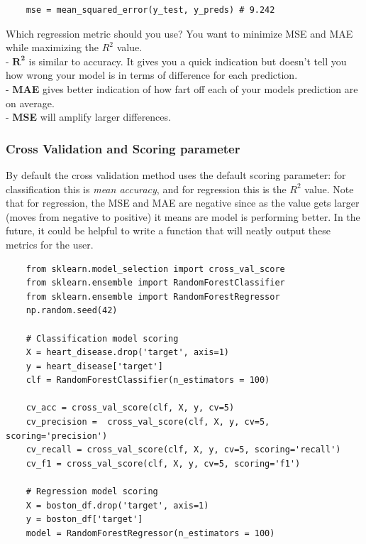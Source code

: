 \documentclass[11pt, a4paper]{article}
\begin{document}
\begin{spacing}{1.1}
\begin{lstlisting}
	mse = mean_squared_error(y_test, y_preds) # 9.242 \end{lstlisting} \vspace*{1mm}
	Which regression metric should you use? You want to minimize MSE and MAE while maximizing the $R^2$ value. \\
	\hspace*{2mm} - $\mathbf{R^2}$ is similar to accuracy. It gives you a quick indication but doesn't tell you how wrong your model \hspace*{4mm} is in terms of difference for each prediction. \\
	\hspace*{2mm} - \textbf{MAE} gives better indication of how fart off each of your models prediction are on average. \\
	\hspace*{2mm} - \textbf{MSE} will amplify larger differences.
	
	\subsubsection{Cross Validation and Scoring parameter}
	By default the cross validation method uses the default scoring parameter: for classification this is \textit{mean accuracy}, and for regression this is the $R^2$ value. Note that for regression, the MSE and MAE are negative since as the value gets larger (moves from negative to positive) it means are model is performing better. In the future, it could be helpful to write a function that will neatly output these metrics for the user. \newpage

	\begin{lstlisting}
	from sklearn.model_selection import cross_val_score
	from sklearn.ensemble import RandomForestClassifier
	from sklearn.ensemble import RandomForestRegressor
	np.random.seed(42)
	
	# Classification model scoring
	X = heart_disease.drop('target', axis=1)
	y = heart_disease['target']
	clf = RandomForestClassifier(n_estimators = 100)
	
	cv_acc = cross_val_score(clf, X, y, cv=5) 
	cv_precision =  cross_val_score(clf, X, y, cv=5, scoring='precision') 
	cv_recall = cross_val_score(clf, X, y, cv=5, scoring='recall')
	cv_f1 = cross_val_score(clf, X, y, cv=5, scoring='f1')
	
	# Regression model scoring
	X = boston_df.drop('target', axis=1)
	y = boston_df['target']
	model = RandomForestRegressor(n_estimators = 100)
	

\end{lstlisting}
\end{spacing}
\end{document}
